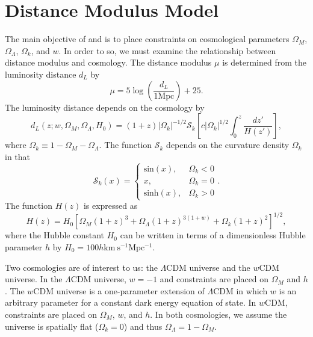 \documentclass[12pt,a4paper]{article}
\begin{document}
\section{Distance Modulus Model}
\label{sec:model}
The main objective of \citet{betoule2014} and \citet{rest2014} is 
to place constraints on cosmological parameters $\Omega_M$, $\Omega_\Lambda$, 
$\Omega_k$, and $w$. In order to so, we must examine the relationship between distance 
modulus and cosmology. The distance modulus $\mu$ is determined from 
the luminosity distance $d_L$ by 
%
\begin{equation}
  \label{eq:mu_dL}
  \mu=5 \log\left(\frac{d_L}{1 \mathrm{Mpc}}\right)+25. 
\end{equation}
%
The luminosity distance depends on the cosmology by 
%
\begin{equation}
\label{eq:luminosityDistance}
d_L(z; w, \Omega_M, \Omega_\Lambda, H_0)= (1+z)|\Omega_k|^{-1/2}\mathcal{S}_{k}\displaystyle\left[c|\Omega_k|^{1/2}\int_{0}^{z}\frac{dz'}{H(z')}\right],
\end{equation}
%
where $\Omega_k \equiv 1-\Omega_M-\Omega_{\Lambda}$. The function 
$\mathcal{S}_{k}$ depends on the curvature density $\Omega_k$ in that 
\[
    \mathcal{S}_{k}(x)= 
\begin{cases}
    \text{sin}(x),&  \Omega_k < 0\\
    x,& \Omega_k = 0\\
    \text{sinh}(x),& \Omega_k > 0
\end{cases}.
\]
The function $H(z)$ is expressed as 
%
\begin{equation}
  \label{eq:hubbleFunction}
  H(z)= H_0\displaystyle\left[\Omega_M(1+z)^3+\Omega_{\Lambda}(1+z)^{3(1+w)}+\Omega_k(1+z)^2\right]^{1/2},
\end{equation}
%
where the Hubble constant $H_0$ can be written in terms of a 
dimensionless Hubble parameter $h$ by $H_0=100h \mathrm{km\ s^{-1}Mpc^{-1}}$.

Two cosmologies are of interest to us: the  $\Lambda$CDM 
universe and the $w$CDM universe. In the  $\Lambda$CDM 
universe, $w=-1$ and constraints are placed on $\Omega_M$ and $h$. 
The $w$CDM universe is a one-parameter extension of  $\Lambda$CDM 
in which $w$ is an arbitrary parameter for a constant dark energy 
equation of state. In $w$CDM, constraints are placed on $\Omega_M$, $w$, 
and $h$. In both cosmologies, we assume the universe is spatially flat 
($\Omega_k = 0$) and thus $\Omega_{\Lambda}=1-\Omega_M$. 
\end{document}
